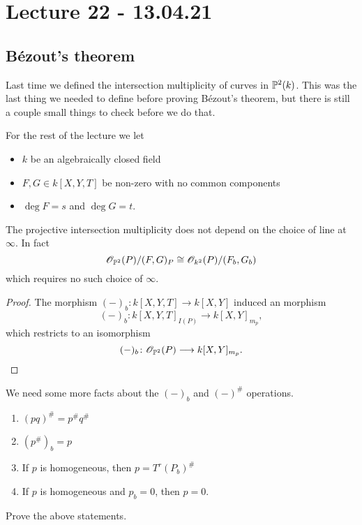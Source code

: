 




\section{Lecture 22 - 13.04.21}

\subsection{Bézout's theorem}

Last time we defined the intersection multiplicity of curves in $\P^2(k)$. This was the last thing we needed to define before proving Bézout's theorem, but there is still a couple small things to check before we do that.

For the rest of the lecture we let
\begin{itemize}
    \item $k$ be an algebraically closed field
    \item $F, G\in k[X, Y, T]$ be non-zero with no common components
    \item $\deg F=s$ and $\deg G=t$. 
\end{itemize}

\begin{lemma}
The projective intersection multiplicity does not depend on the choice of line at $\infty$. In fact
\begin{equation*}
    \O_{\P^2}(P)/(F, G)_P \cong \O_{k^2}(P)/(F_b, G_b)
\end{equation*}
which requires no such choice of $\infty$. 
\end{lemma}
\begin{proof}
The morphism $(-)_b\colon k[X, Y, T]\longrightarrow k[X, Y]$ induced an morphism
\begin{equation*}
    (-)_b\colon k[X, Y, T]_{I(P)}\longrightarrow k[X, Y]_{m_p},
\end{equation*}
which restricts to an isomorphism 
\begin{equation*}
    (-)_b\colon\O_{\P^2}(P)\longrightarrow k[X, Y]_{m_p}.
\end{equation*}
\end{proof}


We need some more facts about the $(-)_b$ and $(-)^\#$ operations. 

\begin{lemma}
\begin{enumerate}
    \item $(pq)^\# = p^\# q^\#$ 
    \item $(p^\#)_b = p$ 
    \item If $p$ is homogeneous, then $p=T^r(P_b)^\#$
    \item If $p$ is homogeneous and $p_b = 0$, then $p=0$.  
\end{enumerate}
\end{lemma}
\begin{problem}
Prove the above statements.
\end{problem}

